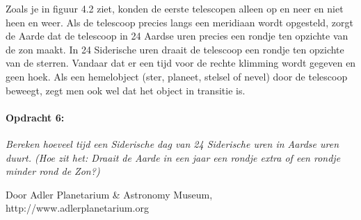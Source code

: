 Zoals je in figuur 4.2 ziet, konden de eerste telescopen alleen op
en neer en niet heen en weer. Als de telescoop precies langs een meridiaan
wordt opgesteld, zorgt de Aarde dat de telescoop in 24 Aardse uren
precies een rondje ten opzichte van de zon maakt. In 24 Siderische
uren draait de telescoop een rondje ten opzichte van de sterren. Vandaar
dat er een tijd voor de rechte klimming wordt gegeven en geen hoek.
Als een hemelobject (ster, planeet, stelsel of nevel) door de telescoop
beweegt, zegt men ook wel dat het object in transitie is.


\paragraph*{Opdracht 6:}

\emph{Bereken hoeveel tijd een Siderische dag van 24 Siderische uren
in Aardse uren duurt. (Hoe zit het: Draait de Aarde in een jaar een
rondje extra of een rondje minder rond de Zon?)}

\begin{thebibliography}{9}
        Door Adler Planetarium \& Astronomy Museum, http://www.adlerplanetarium.org
\end{thebibliography}


